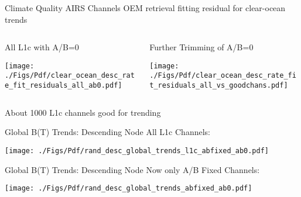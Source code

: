 \documentclass[10pt,t]{beamer}
\begin{document}
\begin{frame}[label={sec:org0e99d8b}]{Climate Quality AIRS Channels}
\vspace{-0.1in}
OEM retrieval fitting residual for clear-ocean trends

\begin{columns}
\begin{column}{0.55\columnwidth}
\begin{block}{All L1c with A/B=0}
\vspace{-0.1in}
\begin{center}
\texttt{[image: ./Figs/Pdf/clear\_ocean\_desc\_rate\_fit\_residuals\_all\_ab0.pdf]}
\end{center}
\end{block}
\end{column}

\begin{column}{0.55\columnwidth}
\begin{block}{Further Trimming of A/B=0}
\vspace{-0.1in}
\begin{center}
\texttt{[image: ./Figs/Pdf/clear\_ocean\_desc\_rate\_fit\_residuals\_all\_vs\_goodchans.pdf]}
\end{center}
\end{block}
\end{column}
\end{columns}

About 1000 L1c channels good for trending
\end{frame}

\begin{frame}[label={sec:org5ae9c1a}]{Global B(T) Trends: Descending Node}
\vspace{-0.1in}
All L1c Channels:

\begin{center}
\texttt{[image: ./Figs/Pdf/rand\_desc\_global\_trends\_l1c\_abfixed\_ab0.pdf]}
\end{center}
\end{frame}

\begin{frame}[label={sec:org70a994a}]{Global B(T) Trends: Descending Node}
\vspace{-0.1in}
Now only A/B Fixed Channels:

\begin{center}
\texttt{[image: ./Figs/Pdf/rand\_desc\_global\_trends\_abfixed\_ab0.pdf]}
\end{center}
\end{frame}
\end{document}
